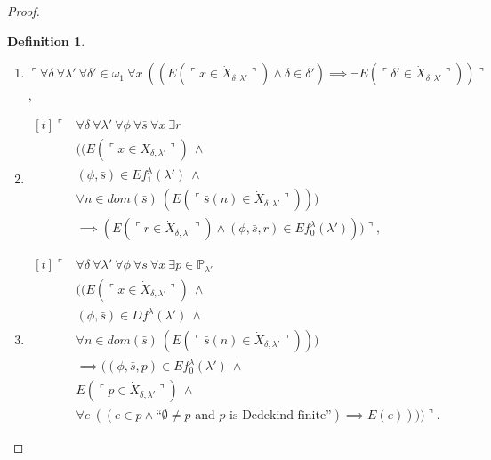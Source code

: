 \documentclass[12pt, twoside]{memoir}
\numberwithin{equation}{section}
\theoremstyle{definition}
\newtheorem{defi}[thm]{Definition}
\theoremstyle{remark}
\theoremstyle{definition}
\theoremstyle{definition}
\theoremstyle{definition}
\theoremstyle{remark}
\begin{document}
\begin{proof}
\begin{defi}
\begin{enumerate}[label=(S\arabic*)$_{\lambda}$, leftmargin=40pt]
    \item\label{c6} $\ulcorner \forall \delta \ \forall \lambda' \ \forall \delta' \in \omega_1 \ \forall x \ ((E(\ulcorner x \in \dot{X}_{\delta, \lambda'} \urcorner) \wedge \delta \in \delta') \implies \neg E(\ulcorner \delta' \in \dot{X}_{\delta, \lambda'} \urcorner)) \urcorner$, 
    
    \item\label{c7} 
    \!
    $\begin{aligned}[t]
        \ulcorner & \forall \delta \ \forall \lambda' \ \forall \phi \ \forall \bar{s} \ \forall x \ \exists r \\
        & ((E(\ulcorner x \in \dot{X}_{\delta, \lambda'} \urcorner) \ \wedge \ \\
        & (\phi, \bar{s}) \in Ef_1^{\lambda}(\lambda') \ \wedge \\
        & \forall n \in dom(\bar{s}) \ (E(\ulcorner \bar{s}(n) \in \dot{X}_{\delta, \lambda'} \urcorner))) \\
        & \implies (E(\ulcorner r \in \dot{X}_{\delta, \lambda'} \urcorner) \wedge (\phi, \bar{s}, r) \in Ef_0^{\lambda}(\lambda'))) \urcorner,
    \end{aligned}$
    
    \item\label{c8}
    \!
    $\begin{aligned}[t]
        \ulcorner & \forall \delta \ \forall \lambda' \ \forall \phi \ \forall \bar{s} \ \forall x \ \exists p \in \mathbb{P}_{\lambda'} \\
        & ((E(\ulcorner x \in \dot{X}_{\delta, \lambda'} \urcorner) \ \wedge \\
        & (\phi, \bar{s}) \in Df^{\lambda}(\lambda') \ \wedge \\
        & \forall n \in dom(\bar{s}) \ (E(\ulcorner \bar{s}(n) \in \dot{X}_{\delta, \lambda'} \urcorner))) \\
        & \implies ((\phi, \bar{s}, p) \in Ef_0^{\lambda}(\lambda') \ \wedge \\
        & E(\ulcorner p \in \dot{X}_{\delta, \lambda'} \urcorner) \ \wedge \\
        & \forall e \ ((e \in p \wedge \text{``}\emptyset \neq p \text{ and } p \text{ is Dedekind-finite''}) \implies E(e)))) \urcorner.
    \end{aligned}$
\end{enumerate}
\end{defi}


\end{proof}
\end{document}
